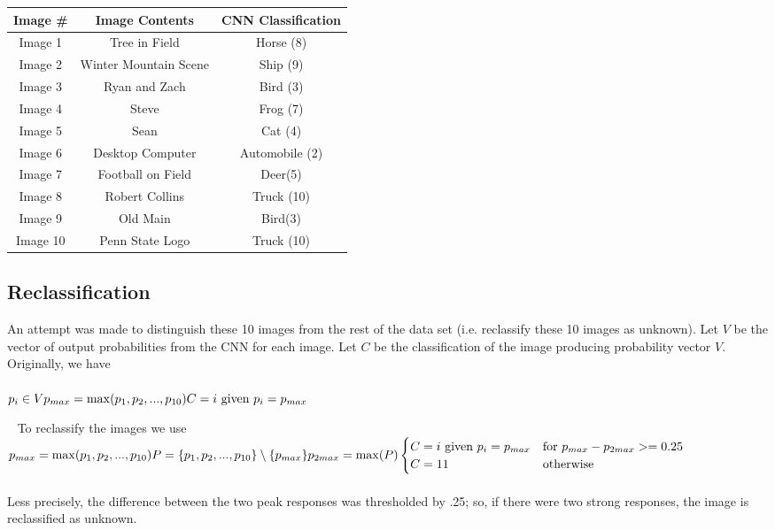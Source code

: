 \documentclass[11pt,english]{article}
\begin{document}
\begin{tabular}{ | c | c | c |}
  \hline
  Image \# & Image Contents & CNN Classification \\
  \hline		
  Image 1 & Tree in Field & Horse (8) \\
  Image 2 & Winter Mountain Scene & Ship (9) \\
  Image 3 & Ryan and Zach & Bird (3) \\
  Image 4 & Steve & Frog (7) \\
  Image 5 & Sean & Cat (4) \\
  Image 6 & Desktop Computer & Automobile (2) \\
  Image 7 & Football on Field & Deer(5) \\
  Image 8 & Robert Collins & Truck (10) \\
  Image 9 & Old Main & Bird(3) \\
  Image 10 & Penn State Logo & Truck (10)\\
  \hline  
\end{tabular}

\subsection{Reclassification}
An attempt was made to distinguish these 10 images from the rest of the data set (i.e. reclassify these 10 images as unknown).  Let $V$ be the vector of output probabilities from the CNN for each image.  Let $C$ be the classification of the image producing probability vector $V$.  Originally, we have\\~\\
\begin{math}
p_i \in V \\
p_{max} = \max(p_1, p_2,...,p_{10}) \\
C = i $ given $ p_i = p_{max}
\end{math}

~\newline\noindent
To reclassify the images we use\\
\noindent
\begin{math}
p_{max} = \max(p_1,p_2,...,p_{10}) \\
P = \{p_1,p_2,...,p_{10}\} \setminus \{p_{max}\} \\
p_{2max} = \max(P) \\~\\
\begin{cases}
C = i $ given $ p_i = p_{max} & $for	$ p_{max} - p_{2max} >= 0.25 \\
C = 11 & $otherwise$
\end{cases}
\end{math}
~\\~\\
Less precisely, the difference between the two peak responses was thresholded by .25; so, if there were two strong responses, the image is reclassified as unknown.
\end{document}

